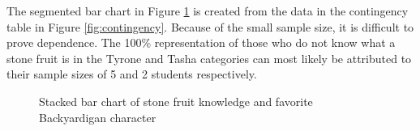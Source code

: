 \documentclass{article}
\begin{document}
The segmented bar chart in Figure \ref{fig:stackedbar} is created from the data
in the contingency table in Figure \ref{fig:contingency}. Because of the small
sample size, it is difficult to prove dependence. The 100\% representation of
those who do not know what a stone fruit is in the Tyrone and Tasha categories
can most likely be attributed to their sample sizes of 5 and 2 students
respectively.

\begin{figure}[ht]
    \centering
    \caption{Stacked bar chart of stone fruit knowledge and favorite Backyardigan character}
    \label{fig:stackedbar}
\end{figure}
\end{document}
